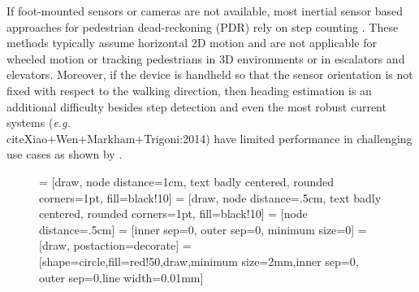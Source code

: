 \documentclass{article}
\newcommand{\eg}{\textit{e.g.}}
\newcommand{\mbf}[1]{\mathbf{#1}}
\newcommand{\vect}[1]{\mbf{#1}}
\begin{document}
If foot-mounted sensors or cameras are not available, most inertial sensor based approaches for pedestrian dead-reckoning (PDR) rely on step counting \cite{Harle:2013, Xiao+Wen+Markham+Trigoni:2014, Mansur+Makihara+Aqmar+Yagi:2014}. These methods typically assume horizontal 2D motion and are not applicable for wheeled motion or tracking pedestrians in 3D environments or in escalators and elevators. Moreover, if the device is handheld so that the sensor orientation is not fixed with respect to the walking direction, then heading estimation is an additional difficulty besides step detection and even the most robust current systems (\eg\\cite{Xiao+Wen+Markham+Trigoni:2014}) have limited performance in challenging use cases as shown by \cite{Chen+Lu+Markham+Trigoni:2018}.


\begin{figure}[t]
  \centering\footnotesize


   = [draw, node distance=1cm, text badly centered, rounded corners=1pt, fill=black!10]
   = [draw, node distance=.5cm, text badly centered, rounded corners=1pt, fill=black!10]
   = [node distance=.5cm]
   = [inner sep=0, outer sep=0, minimum size=0]
   = [draw, postaction={decorate}]
   = [shape=circle,fill=red!50,draw,minimum size=2mm,inner sep=0, outer sep=0,line width=0.01mm]


  \usetikzlibrary{decorations.markings}


\end{figure}
\end{document}
